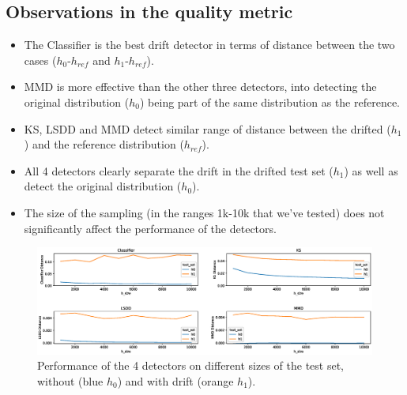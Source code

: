 \documentclass[12pt]{report}
\begin{document}
\subsection{Observations in the quality metric}

\begin{itemize}
    \item The Classifier is the best drift detector in terms of distance between the two cases (\(h_0\)-\(h_{ref}\) and \(h_1\)-\(h_{ref}\)).
    \item MMD is more effective than the other three detectors, into detecting the original distribution (\(h_0\)) being part of the same distribution as the reference.
    \item KS, LSDD and MMD detect similar range of distance between the drifted (\(h_1\)) and the reference distribution (\(h_{ref}\)).
    \item All 4 detectors clearly separate the drift in the drifted test set (\(h_1\)) as well as detect the original distribution (\(h_0\)).
    \item The size of the sampling (in the ranges 1k-10k that we've tested) does not significantly affect the performance of the detectors.
\end{itemize}

\begin{figure}[h]
\includegraphics[width=\linewidth]{images/ALL-detector-distances}
\caption{Performance of the 4 detectors on different sizes of the test set, without (blue \(h_0\)) and with drift (orange \(h_1\)).}
\label{fig:distance}
\end{figure}
\end{document}
